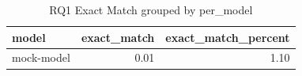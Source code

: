 \begin{table}
\caption{RQ1 Exact Match grouped by per_model}
\label{tab:rq1_per_model}
\begin{tabular}{lrr}
\toprule
model & exact_match & exact_match_percent \\
\midrule
mock-model & 0.01 & 1.10 \\
\bottomrule
\end{tabular}
\end{table}

